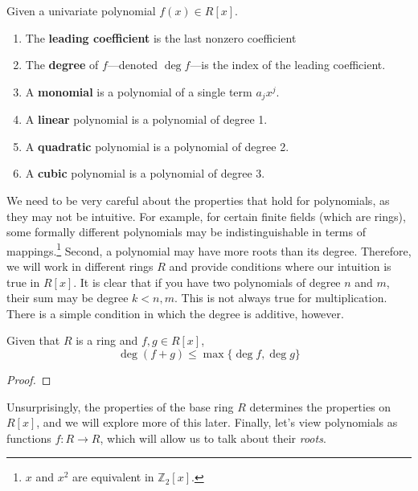   \begin{definition}
    Given a univariate polynomial $f(x) \in R[x]$. 
    \begin{enumerate} 
      \item The \textbf{leading coefficient} is the last nonzero coefficient  
      \item The \textbf{degree} of $f$---denoted $\deg f$---is the index of the leading coefficient.
      \item A \textbf{monomial} is a polynomial of a single term $a_j x^j$. 
      \item A \textbf{linear} polynomial is a polynomial of degree 1. 
      \item A \textbf{quadratic} polynomial is a polynomial of degree 2. 
      \item A \textbf{cubic} polynomial is a polynomial of degree 3. 
    \end{enumerate}
  \end{definition}

  We need to be very careful about the properties that hold for polynomials, as they may not be intuitive. For example, for certain finite fields (which are rings), some formally different polynomials may be indistinguishable in terms of mappings.\footnote{$x$ and $x^2$ are equivalent in  $\mathbb{Z}_2 [x]$. } Second, a polynomial may have more roots than its degree. Therefore, we will work in different rings $R$ and provide conditions where our intuition is true in $R[x]$. It is clear that if you have two polynomials of degree $n$ and $m$, their sum may be degree $k < n, m$. This is not always true for multiplication. There is a simple condition in which the degree is additive, however. 

  \begin{lemma}
    Given that $R$ is a ring and $f, g \in R[x]$, 
    \begin{equation}
      \deg(f+g) \leq \max\{\deg f, \deg g\}
    \end{equation}
  \end{lemma}
  \begin{proof}

  \end{proof}

  Unsurprisingly, the properties of the base ring $R$ determines the properties on $R[x]$, and we will explore more of this later. Finally, let's view polynomials as functions $f: R \to R$, which will allow us to talk about their \textit{roots}. 

